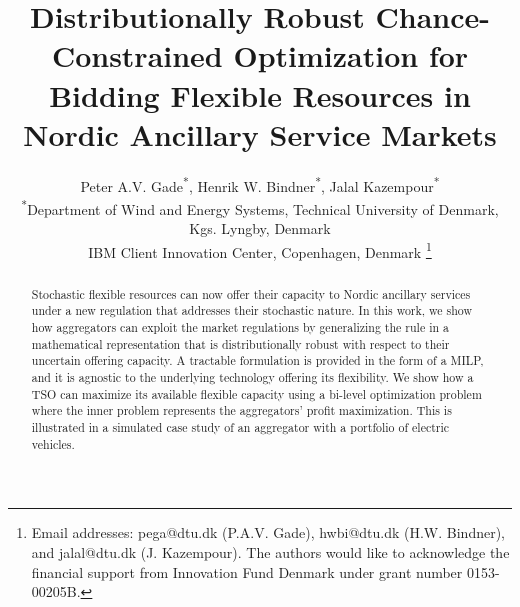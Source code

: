 \documentclass[conference]{IEEEtran}
\begin{document}
\title{Distributionally Robust Chance-Constrained Optimization for Bidding Flexible Resources in Nordic Ancillary Service Markets}

\author{Peter A.V. Gade\textsuperscript{*}\textsuperscript{\textdagger}, Henrik W. Bindner\textsuperscript{*}, Jalal Kazempour\textsuperscript{*} \\
    \textsuperscript{*}Department of Wind and Energy Systems, Technical University of Denmark, Kgs. Lyngby, Denmark \\
    \textsuperscript{\textdagger}IBM Client Innovation Center, Copenhagen, Denmark
    \thanks{
        Email addresses: pega@dtu.dk (P.A.V. Gade), hwbi@dtu.dk (H.W. Bindner), and jalal@dtu.dk (J. Kazempour). The authors would like to acknowledge the financial support from Innovation Fund Denmark under grant number 0153-00205B.}%
    \vspace{-3mm}
}




\maketitle


\IEEEaftertitletext{\vspace{-0.8\baselineskip}}
\maketitle
\thispagestyle{plain}
\pagestyle{plain}
\begin{abstract}
    Stochastic flexible resources can now offer their capacity to Nordic ancillary services under a new regulation that addresses their stochastic nature. In this work, we show how aggregators can exploit the market regulations by generalizing the rule in a mathematical representation that is distributionally robust with respect to their uncertain offering capacity. A tractable formulation is provided in the form of a MILP, and it is agnostic to the underlying technology offering its flexibility. We show how a TSO can maximize its available flexible capacity using a bi-level optimization problem where the inner problem represents the aggregators' profit maximization. This is illustrated in a simulated case study of an aggregator with a portfolio of electric vehicles. 
\end{abstract}
\end{document}
